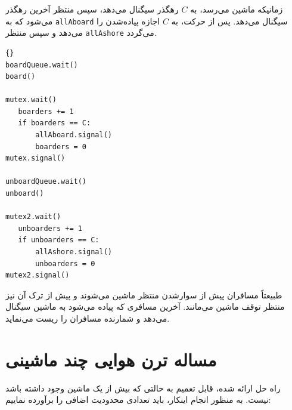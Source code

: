 \documentclass{book}
\newcommand{\clearemptydoublepage}{\newpage\cleardoublepage}
\begin{document}
    زمانیکه ماشین می‌رسد، به $C$  رهگذر سیگنال می‌دهد، سپس منتظر آخرین رهگذر می‌شود که به {\tt allAboard} سیگنال می‌دهد. 
    پس از حرکت، به $C$ اجازه پیاده‌شدن را می‌دهد و سپس منتظر {\tt allAshore} می‌گردد. 
\begin{latin}
\begin{latin}
\begin{lstlisting}[title=\rl{راه حل ترن هوایی (رهگذر)}]{} 
boardQueue.wait()
board()

mutex.wait()
   boarders += 1
   if boarders == C:
       allAboard.signal()
       boarders = 0
mutex.signal()

unboardQueue.wait()
unboard()

mutex2.wait()
   unboarders += 1
   if unboarders == C:
       allAshore.signal()
       unboarders = 0
mutex2.signal()
\end{lstlisting}
\end{latin}
\end{latin}

    طبیعتاً مسافران پیش از سوارشدن منتظر ماشین می‌شوند و پیش از ترک آن نیز منتظر توقف ماشین می‌مانند. 
    آخرین مسافری که پیاده می‌شود به ماشین سیگنال می‌دهد و شمارنده مسافران را ریست می‌نماید. 


\clearemptydoublepage
\section{مساله ترن هوایی چند ماشینی}

    راه حل ارائه شده، قابل تعمیم به حالتی که بیش از یک ماشین وجود داشته باشد نیست. به منظور انجام اینکار، باید تعدادی محدودیت اضافی را برآورده نماییم:
\end{document}
